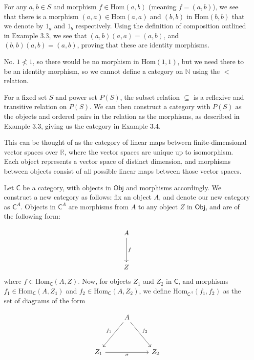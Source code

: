 \exercise For any $a,b \in S$ and morphism $f \in \text{Hom}(a,b)$ (meaning $f = (a,b)$), we see that there is a morphism $(a,a) \in \text{Hom}(a,a)$ and $(b,b)$ in $\text{Hom}(b,b)$ that we denote by $1_a$ and $1_b$ respectively. Using the definition of composition outlined in Example 3.3, we see that $(a,b)(a,a) = (a,b)$, and $(b,b)(a,b) = (a,b)$, proving that these are identity morphisms.

\exercise No. $1 \not < 1$, so there would be no morphism in $\text{Hom}(1,1)$, but we need there to be an identity morphism, so we cannot define a category on $\mathbb{N}$ using the $<$ relation.

\exercise For a fixed set $S$ and power set $P(S)$, the subset relation $\subseteq$ is a reflexive and transitive relation on $P(S)$. We can then construct a category with $P(S)$ as the objects and ordered pairs in the relation as the morphisms, as described in Example 3.3, giving us the category in Example 3.4.

\exercise This can be thought of as the category of linear maps between finite-dimensional vector spaces over $\mathbb{R}$, where the vector spaces are unique up to isomorphism. Each object represents a vector space of distinct dimension, and morphisms between objects consist of all possible linear maps between those vector spaces.

\exercise Let $\textsf{C}$ be a category, with objects in $\textsf{Obj}$ and morphisms accordingly. We construct a new category as follows: fix an object $A$, and denote our new category as $\textsf{C}^A$. Objects in $\textsf{C}^A$ are morphisms from $A$ to any object $Z$ in $\textsf{Obj}$, and are of the following form:

\[\begin{tikzcd}
	A \\
	\\
	Z
	\arrow["f", from=1-1, to=3-1]
\end{tikzcd}\]
where $f \in \text{Hom}_{\textsf{C}}(A,Z)$. Now, for objects $Z_1$ and $Z_2$ in $\textsf{C}$, and morphisms $f_1 \in \text{Hom}_{\textsf{C}}(A,Z_1)$ and $f_2 \in \text{Hom}_{\textsf{C}}(A,Z_2)$, we define $\text{Hom}_{\textsf{C}^A}(f_1,f_2)$ as the set of diagrams of the form 

\[\begin{tikzcd}
	& A & \\
	\\
	Z_1 && Z_2
	\arrow["f_1"', from=1-2, to=3-1]
	\arrow["f_2", from=1-2, to=3-3]
	\arrow["\sigma"', from=3-1, to=3-3]
\end{tikzcd}\]

